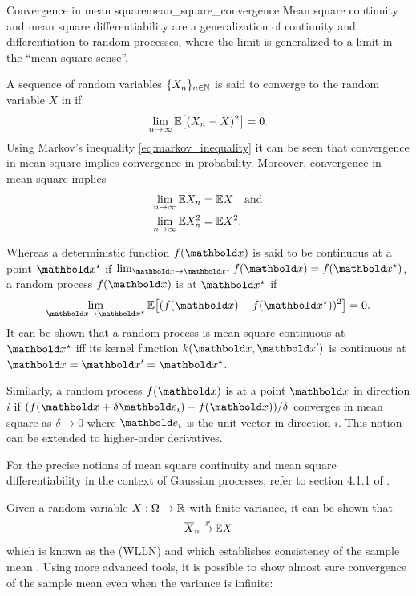\begin{rmk}{Convergence in mean square}{mean_square_convergence}
  Mean square continuity and mean square differentiability are a generalization of continuity and differentiation to random processes, where the limit is generalized to a limit in the ``mean square sense''.

  A sequence of random variables $\{X_n\}_{n \in \mathbb{N}}$ is said to converge to the random variable $X$ in  if \begin{align}
    \lim_{n\to\infty} \E{(X_n - X)^2} = 0.
  \end{align}
  Using Markov's inequality \eqref{eq:markov_inequality} it can be seen that convergence in mean square implies convergence in probability.
  Moreover, convergence in mean square implies \begin{align}
    \lim_{n\to\infty} \E*{X_n} &= \E*{X} \quad\text{and} \\
    \lim_{n\to\infty} \E*{X_n^2} &= \E*{X^2}.
  \end{align}

  Whereas a deterministic function $f(\vx)$ is said to be continuous at a point $\vxs$ if $\lim_{\vx\to\vxs} f(\vx) = f(\vxs)$, a random process $f(\vx)$ is  at $\vxs$ if \begin{align}
    \lim_{\vx\to\vxs} \E{(f(\vx) - f(\vxs))^2} = 0.
  \end{align}
  It can be shown that a random process is mean square continuous at $\vxs$ iff its kernel function $k(\vx, \vxp)$ is continuous at $\vx = \vxp = \vxs$.

  Similarly, a random process $f(\vx)$ is  at a point $\vx$ in direction $i$ if $(f(\vx + \delta \ve_i) - f(\vx)) / \delta$ converges in mean square as $\delta \to 0$ where $\ve_i$ is the unit vector in direction $i$.
  This notion can be extended to higher-order derivatives.

  For the precise notions of mean square continuity and mean square differentiability in the context of Gaussian processes, refer to section 4.1.1 of .
\end{rmk}

Given a random variable $X : \Omega \to \mathbb{R}$ with finite variance, it can be shown that \begin{align}
  \mean{X}_n \convp \E*{X} \label{eq:wlln}
\end{align} which is known as the  (WLLN) and which establishes consistency of the sample mean .
Using more advanced tools, it is possible to show almost sure convergence of the sample mean even when the variance is infinite:

